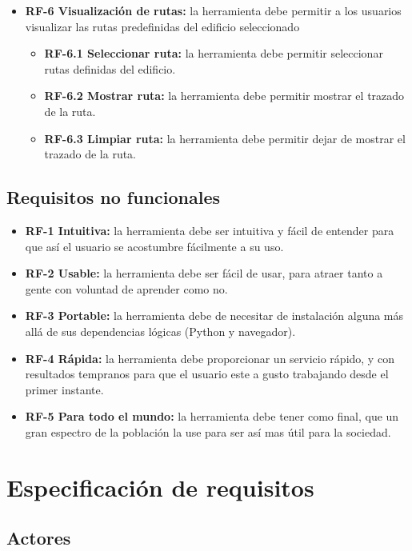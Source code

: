 \begin{itemize}
\begin{itemize}
\end{itemize}
\item
\textbf{RF-6 Visualización de rutas:} la herramienta debe permitir a los usuarios visualizar las rutas predefinidas del edificio seleccionado
\begin{itemize}
	\item
	\textbf{RF-6.1 Seleccionar ruta:} la herramienta debe permitir seleccionar rutas definidas del edificio.
	\item
	\textbf{RF-6.2 Mostrar ruta:} la herramienta debe permitir mostrar el trazado de la ruta.
	\item
	\textbf{RF-6.3 Limpiar ruta:} la herramienta debe permitir dejar de mostrar el trazado de la ruta.
\end{itemize}
\end{itemize}

\subsection{Requisitos no funcionales}

\begin{itemize}
	\item
	\textbf{RF-1 Intuitiva:} la herramienta debe ser intuitiva y fácil de entender para que así el usuario se acostumbre fácilmente a su uso.
	\item
	\textbf{RF-2 Usable:} la herramienta debe ser fácil de usar, para atraer tanto a gente con voluntad de aprender como no.
	\item
	\textbf{RF-3 Portable:} la herramienta debe de necesitar de instalación alguna más allá de sus dependencias lógicas (Python y navegador).
	\item
	\textbf{RF-4 Rápida:} la herramienta debe proporcionar un servicio rápido, y con resultados tempranos para que el usuario este a gusto trabajando desde el primer instante.
	\item
	\textbf{RF-5 Para todo el mundo:} la herramienta debe tener como final, que un gran espectro de la población la use para ser así mas útil para la sociedad.
\end{itemize}

\section{Especificación de requisitos}

\subsection{Actores}

